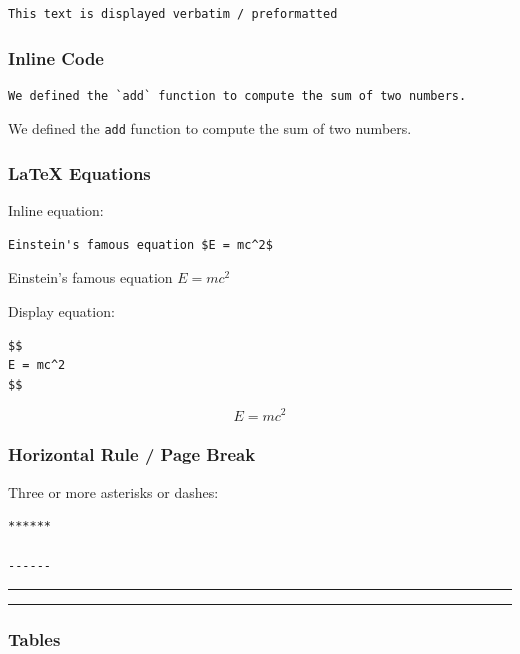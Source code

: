 \documentclass[]{book}
\theoremstyle{definition}
\theoremstyle{definition}
\theoremstyle{definition}
\theoremstyle{remark}
\begin{document}
\begin{verbatim}
This text is displayed verbatim / preformatted
\end{verbatim}

\subsubsection{Inline Code}\label{inline-code}

\begin{verbatim}
We defined the `add` function to compute the sum of two numbers.
\end{verbatim}

We defined the \texttt{add} function to compute the sum of two numbers.

\subsubsection{LaTeX Equations}\label{latex-equations}

Inline equation:

\begin{verbatim}
Einstein's famous equation $E = mc^2$
\end{verbatim}

Einstein's famous equation \(E = mc^2\)

Display equation:

\begin{verbatim}
$$
E = mc^2
$$
\end{verbatim}

\[
E = mc^2
\]

\subsubsection{Horizontal Rule / Page
Break}\label{horizontal-rule-page-break}

Three or more asterisks or dashes:

\begin{verbatim}
******

------
\end{verbatim}

\begin{center}\rule{0.5\linewidth}{\linethickness}\end{center}

\begin{center}\rule{0.5\linewidth}{\linethickness}\end{center}

\subsubsection{Tables}\label{tables}
\end{document}
